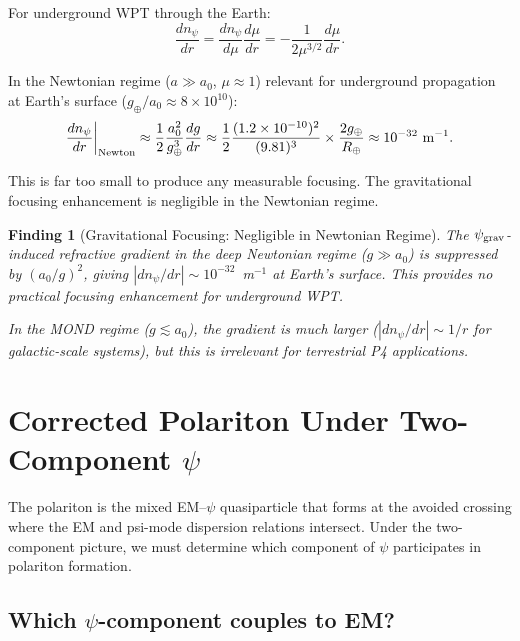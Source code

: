 \documentclass[11pt]{article}
\newtheorem{finding}{Finding}
\newcommand{\ee}[1]{\times 10^{#1}}
\newcommand{\psigrav}{\psi_{\rm grav}}
\newcommand{\npsi}{n_\psi}
\newcommand{\mufd}{\mu}
\begin{document}
For underground WPT through the Earth:
\begin{equation}
\frac{d\npsi}{dr} = \frac{d\npsi}{d\mufd}\frac{d\mufd}{dr}
= -\frac{1}{2\mufd^{3/2}}\frac{d\mufd}{dr}.
\label{eq:dnpsi-dr}
\end{equation}

In the Newtonian regime ($a \gg a_0$, $\mufd \approx 1$) relevant for
underground propagation at Earth's surface ($g_\oplus/a_0 \approx 8\ee{10}$):
\begin{equation}
\frac{d\npsi}{dr}\bigg|_{\rm Newton} \approx
\frac{1}{2}\frac{a_0^2}{g_\oplus^3}\frac{dg}{dr}
\approx \frac{1}{2}\frac{(1.2\ee{-10})^2}{(9.81)^3}\times\frac{2g_\oplus}{R_\oplus}
\approx 10^{-32}~\text{m}^{-1}.
\label{eq:dnpsi-Newton}
\end{equation}

This is far too small to produce any measurable focusing. The gravitational
focusing enhancement is negligible in the Newtonian regime.

\begin{finding}[Gravitational Focusing: Negligible in Newtonian Regime]
\label{find:grav-focusing}
The $\psigrav$-induced refractive gradient in the deep Newtonian regime
($g \gg a_0$) is suppressed by $(a_0/g)^2$, giving $|d\npsi/dr| \sim
10^{-32}$~m$^{-1}$ at Earth's surface. This provides no practical focusing
enhancement for underground WPT.

In the MOND regime ($g \lesssim a_0$), the gradient is much larger
($|d\npsi/dr| \sim 1/r$ for galactic-scale systems), but this is irrelevant
for terrestrial P4 applications.
\end{finding}

\section{Corrected Polariton Under Two-Component $\psi$}
\label{sec:polariton}

The polariton is the mixed EM--$\psi$ quasiparticle that forms at the
avoided crossing where the EM and psi-mode dispersion relations intersect.
Under the two-component picture, we must determine which component of
$\psi$ participates in polariton formation.

\subsection{Which $\psi$-component couples to EM?}
\end{document}
